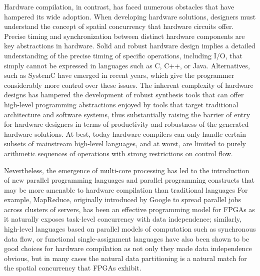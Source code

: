 Hardware compilation, in contrast, has faced numerous obstacles that have hampered its wide adoption. When developing hardware solutions, designers must understand the concept of spatial concurrency that hardware circuits offer. 
Precise timing and synchronization between distinct hardware components are key abstractions in hardware. 
Solid and robust hardware design implies a detailed understanding of the precise timing of specific operations, including I/O, that simply cannot be expressed in languages such as C, C++, or Java. Alternatives, such as SystemC have emerged in recent years, which give the programmer considerably more control over these issues. 
The inherent complexity of hardware designs has hampered the development of robust synthesis tools that can offer high-level programming abstractions enjoyed by tools that target traditional architecture and software systems, thus substantially raising the barrier of entry for hardware designers in terms of productivity and robustness of the generated hardware solutions. 
At best, today hardware compilers can only handle certain subsets of mainstream high-level languages, and at worst, are limited to purely arithmetic sequences of operations with strong restrictions on control flow.

Nevertheless, the emergence of multi-core processing has led to the introduction of new parallel programming languages and parallel programming constructs that may be more amenable to hardware compilation than traditional languages 
% 
% 
For example, MapReduce, originally introduced by Google to spread parallel jobs across clusters of servers, has been an effective programming model for FPGAs as it naturally exposes task-level concurrency with data independence; 
similarly, high-level languages based on parallel models of computation such as synchronous data flow, or functional single-assignment languages have also been shown to be good choices for hardware compilation as not only they made data independence obvious, but in many cases the natural data partitioning is a natural match for the spatial concurrency that FPGAs exhibit.

